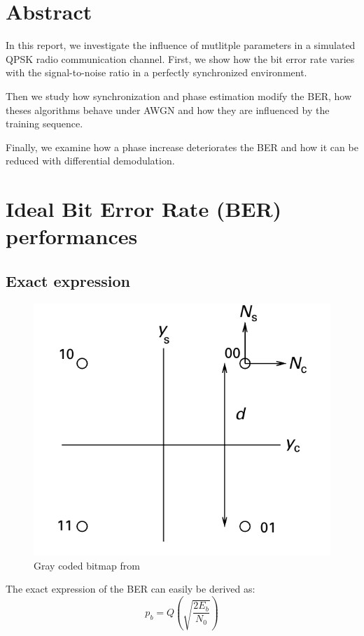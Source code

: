 \documentclass[a4paper,12pt]{article}
\begin{document}

\newpage

\section*{Abstract}
In this report, we investigate the influence of mutlitple parameters in a simulated QPSK radio communication channel.
First, we show how the bit error rate varies with the signal-to-noise ratio in a perfectly synchronized environment. 

Then we study how synchronization and phase estimation modify the BER, how theses algorithms behave under AWGN and how they are influenced by the training sequence.

Finally, we examine how a phase increase deteriorates the BER and how it can be reduced with differential demodulation.

\section{Ideal Bit Error Rate (BER) performances}

\subsection{Exact expression}
\begin{figure}[ht!]
\centering
\begin{center}
\includegraphics[scale=0.20]{Gray_coded_QPSK.png}
\caption{Gray coded bitmap from \cite{Madhow}}
\end{center}
\end{figure}
The exact expression of the BER can easily be derived as:
\begin{equation}
p_{b}=Q(\sqrt{\frac{2E_{b}}{N_{0}}})
\end{equation}
\end{document}
